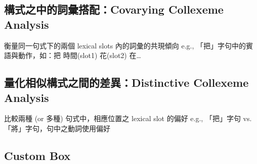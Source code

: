 \begin{Shaded}
\begin{Highlighting}[]
\NormalTok{\{}
    \NormalTok{: \{ }
    \NormalTok{: \{ }
    \NormalTok{: \{ }
\NormalTok{\}}
\end{Highlighting}
\end{Shaded}

\hypertarget{ux69cbux5f0fux4e4bux4e2dux7684ux8a5eux5f59ux642dux914dcovarying-collexeme-analysis}{%
\subsection{構式之中的詞彙搭配：Covarying Collexeme
Analysis}\label{ux69cbux5f0fux4e4bux4e2dux7684ux8a5eux5f59ux642dux914dcovarying-collexeme-analysis}}

衡量同一句式下的兩個 lexical slots 內的詞彙的共現傾向 e.g.,
「把」字句中的賓語與動作，如：把 時間(slot1) 花(slot2) 在\ldots{}

\hypertarget{ux91cfux5316ux76f8ux4f3cux69cbux5f0fux4e4bux9593ux7684ux5deeux7570distinctive-collexeme-analysis}{%
\subsection{量化相似構式之間的差異：Distinctive Collexeme
Analysis}\label{ux91cfux5316ux76f8ux4f3cux69cbux5f0fux4e4bux9593ux7684ux5deeux7570distinctive-collexeme-analysis}}

比較兩種 (or 多種) 句式中，相應位置之 lexical slot 的偏好 e.g.,
「把」字句 vs.「將」字句，句中之動詞使用偏好

\hypertarget{custom-box}{%
\subsection{Custom Box}\label{custom-box}}

